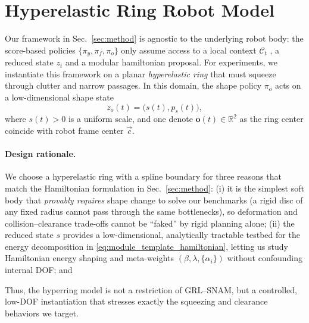 \section{Hyperelastic Ring Robot Model}
\label{app:hyperelastic_model}

Our framework in Sec.~\ref{sec:method} is agnostic to the underlying robot body: the score-based policies $\{\pi_y,\pi_f,\pi_o\}$ only assume access to a local context $\mathcal{C}_t$ , a reduced state $z_t$ and a modular hamiltonian proposal. For experiments, we instantiate this framework on a planar \emph{hyperelastic ring} that must squeeze through clutter and narrow passages. In this domain, the shape policy $\pi_o$ acts on a low-dimensional shape state
\[
z_o(t) = \big(s(t), p_s(t)\big),
\]
where $s(t)\!>\!0$ is a uniform scale, and one denote $\mathbf{o}(t)\in\mathbb{R}^2$ as the ring center coincide with robot frame center $\vec{c}$.

\paragraph{Design rationale.}
We choose a hyperelastic ring with a spline boundary for three reasons that match the Hamiltonian formulation in Sec.~\ref{sec:method}:
(i) it is the simplest soft body that \emph{provably requires} shape change to solve our benchmarks (a rigid disc of any fixed radius cannot pass through the same bottlenecks), so deformation and collision–clearance trade-offs cannot be “faked” by rigid planning alone;
(ii) the reduced state $s$ provides a low-dimensional, analytically tractable testbed for the energy decomposition in \cref{eq:module_template_hamiltonian}, letting us study Hamiltonian energy shaping and meta-weights $(\beta,\lambda,\{\alpha_i\})$ without confounding internal DOF; and

Thus, the hyperring model is not a restriction of GRL--SNAM, but a controlled, low-DOF instantiation that stresses exactly the squeezing and clearance behaviors we target.

